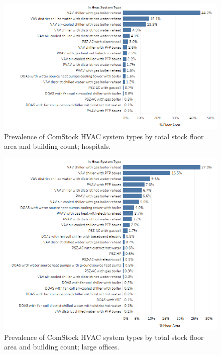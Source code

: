 \begin{figure}
    \centering \includegraphics[width=1.0\textwidth]{figures/HVAC_SYS_Type_PREV_HOS.png}
    \caption[HVAC system type prevalence in hospitals]{Prevalence of ComStock HVAC system types by total stock floor area and building count; hospitals.}
    \label{fig:hvac_sys_type_prevalence_hos}
\end{figure}


\begin{figure}
    \centering \includegraphics[width=1.0\textwidth]{figures/HVAC_SYS_Type_PREV_LrgOffice.png}
    \caption[HVAC system type prevalence in large offices]{Prevalence of ComStock HVAC system types by total stock floor area and building count; large offices.}
    \label{fig:hvac_sys_type_prevalence_lrgoffice}
\end{figure}

